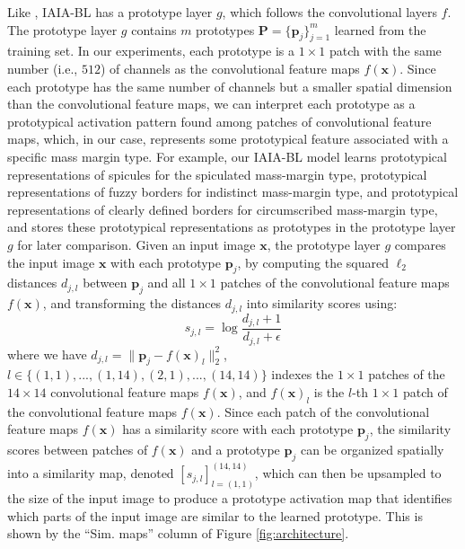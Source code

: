 \documentclass[11pt]{article}
\begin{document}
Like \cite{PPNet}, IAIA-BL has a prototype layer $g$, which follows the convolutional layers $f$. The prototype layer $g$ contains $m$ prototypes $\mathbf{P}=\{\mathbf{p}_j\}_{j=1}^m$ learned from the training set. In our experiments, each prototype is a $1 \times 1$ patch with the same number (i.e., $512$) of channels as the convolutional feature maps $f(\mathbf{x})$. Since each prototype has the same number of channels but a smaller spatial dimension than the convolutional feature maps, we can interpret each prototype as a prototypical activation pattern found among patches of convolutional feature maps, which, in our case, represents some prototypical feature associated with a specific mass margin type. For example, our IAIA-BL model learns prototypical representations of spicules for the spiculated mass-margin type, prototypical representations of fuzzy borders for indistinct mass-margin type, and prototypical representations of clearly defined borders for circumscribed mass-margin type, and stores these prototypical representations as prototypes in the prototype layer $g$ for later comparison. Given an input image $\mathbf{x}$, the prototype layer $g$ compares the input image $\mathbf{x}$ with each prototype $\mathbf{p}_j$, by computing the squared $\ell_2$ distances $d_{j,l}$ between $\mathbf{p}_j$ and all $1 \times 1$ patches of the convolutional feature maps $f(\mathbf{x})$, and transforming the distances $d_{j,l}$ into similarity scores using:
\[
s_{j,l} = \log\frac{d_{j,l}+1}{d_{j,l}+\epsilon}
\]
where we have $d_{j,l} = \|\mathbf{p}_j-f(\mathbf{x})_l\|_2^2$, $l \in \{(1,1),...,(1,14),(2,1),...,(14,14)\}$ indexes the $1 \times 1$ patches of the $14 \times 14$ convolutional feature maps $f(\mathbf{x})$, and $f(\mathbf{x})_l$ is the $l$-th $1 \times 1$ patch of the convolutional feature maps $f(\mathbf{x})$. Since each patch of the convolutional feature maps $f(\mathbf{x})$ has a similarity score with each prototype $\mathbf{p}_j$, the similarity scores between patches of $f(\mathbf{x})$ and a prototype $\mathbf{p}_j$ can be organized spatially into a similarity map, denoted $[s_{j,l}]_{l=(1,1)}^{(14,14)}$, which can then be upsampled to the size of the input image to produce a prototype activation map that identifies which parts of the input image are similar to the learned prototype. This is shown by the ``Sim. maps'' column of Figure \ref{fig:architecture}.
\end{document}
